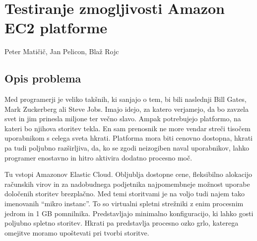 \chapter[Testiranje zmogljivosti Amazon EC2 platforme (P. Matičič, J. Pelicon, B. Rojc)]{Testiranje zmogljivosti Amazon EC2 platforme}

\pagestyle{fancy}
\fancyhf{}
\fancyhead[LE,RO]{\thepage}
\fancyhead[RE,LO]{\leftmark}

\huge Peter Matičič, Jan Pelicon, Blaž Rojc
\normalsize
\bigskip

\section{Opis problema}

%

Med programerji je veliko takšnih, ki sanjajo o tem, bi bili naslednji Bill Gates, Mark Zuckerberg ali Steve Jobs.
Imajo idejo, za katero verjamejo, da bo zavzela svet in jim prinesla miljone ter večno slavo.
Ampak potrebujejo platformo, na kateri bo njihova storitev tekla.
En sam prenosnik ne more vendar streči tisočem uporabnikom s celega sveta hkrati.
Platforma mora biti cenovno dostopna, hkrati pa tudi poljubno razširljiva, da, ko se zgodi neizogiben naval uporabnikov, lahko programer enostavno in hitro aktivira dodatno procesno moč.

Tu vstopi Amazonov Elastic Cloud. \cite{1_aws_ec_site} %
Obljublja dostopne cene, fleksibilno alokacijo računskih virov in za nadobudnega podjetnika najpomembneje možnost uporabe določenih storitev brezplačno.
Med temi storitvami je na voljo tudi najem tako imenovanih ``mikro instanc''. \cite{1_aws_free} %
To so virtualni spletni strežniki z enim procesnim jedrom in 1 GB pomnilnika.
Predstavljajo minimalno konfiguracijo, ki lahko gosti poljubno spletno storitev.
Hkrati pa predstavlja procesno ozko grlo, katerega omejitve moramo upoštevati pri tvorbi storitve.

